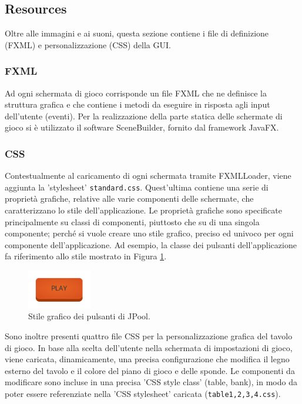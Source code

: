\documentclass[12pt,a4paper]{report}
\begin{document}
\pagebreak

\subsection{Resources} \label{se:Resources} %

Oltre alle immagini e ai suoni, questa sezione contiene i file di definizione (FXML) e personalizzazione (CSS) della GUI.

\subsubsection*{FXML}
Ad ogni schermata di gioco corrisponde un file FXML che ne definisce la struttura grafica e che contiene i metodi da eseguire in risposta agli input dell'utente (eventi).
Per la realizzazione della parte statica delle schermate di gioco si è utilizzato il software SceneBuilder, fornito dal framework JavaFX. \cite{JavaFX}

\subsubsection*{CSS}
Contestualmente al caricamento di ogni schermata tramite FXMLLoader, viene aggiunta la 'stylesheet' \texttt{standard.css}.
Quest'ultima contiene una serie di proprietà grafiche, relative alle varie componenti delle schermate, che caratterizzano lo stile dell'applicazione.
Le proprietà grafiche sono specificate principalmente su classi di componenti, piuttosto che su di una singola componente; perché si vuole creare uno stile grafico, preciso ed univoco per ogni componente dell'applicazione.
Ad esempio, la classe dei pulsanti dell'applicazione fa riferimento allo stile mostrato in Figura \ref{fig:ButtonStyle}.

\begin{figure}[h]
    \centering
    \includegraphics[width=0.25\textwidth]{ButtonStyle.png}
    \caption{Stile grafico dei pulsanti di JPool.}
    \label{fig:ButtonStyle}
\end{figure}

Sono inoltre presenti quattro file CSS per la personalizzazione grafica del tavolo di gioco.
In base alla scelta dell'utente nella schermata di impostazioni di gioco, viene caricata, dinamicamente, una precisa configurazione che modifica il legno esterno del tavolo e il colore del piano di gioco e delle sponde.
Le componenti da modificare sono incluse in una precisa 'CSS style class' (table, bank), in modo da poter essere referenziate nella 'CSS stylesheet' caricata (\texttt{table1,2,3,4.css}).
\end{document}
